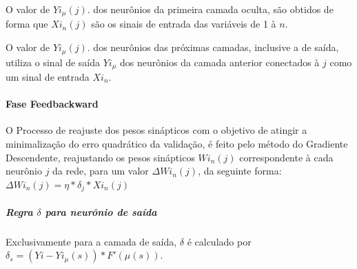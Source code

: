 \documentclass[	12pt, Times, openright, twoside, a4paper, english, brazil]{abntex2}
\begin{document}
           \begin{figure}[H]
           \end{figure}
            
            O valor de $Yi_{\mu}(j)$. dos neurônios da primeira camada oculta, são obtidos de forma que $Xi_{n}(j)$ são os sinais de entrada das variáveis de 1 à $n$.
            
            O valor de $Yi_{\mu}(j)$. dos neurônios das próximas camadas, inclusive a de saída, utiliza o sinal de saída $Yi_{\mu}$ dos neurônios da camada anterior conectados à $j$ como um sinal de entrada $Xi_{n}$.
            
            \paragraph*{Fase Feedbackward}
            O Processo de reajuste dos pesos sinápticos com o objetivo de atingir a minimalização do erro quadrático da validação, é feito pelo método do Gradiente Descendente, reajustando os pesos sinápticos $Wi_{n}(j)$ correspondente à cada neurônio $j$ da rede, para um valor $\Delta Wi_{n}(j)$, da seguinte forma:\\
            $\Delta Wi_{n}(j) = \eta*\delta_j*Xi_{n}(j)$\\
            
            \subparagraph*{Regra $\delta$ para neurônio de saída}
            Exclusivamente para a camada de saída, $\delta$ é calculado por\\
            $\delta_s = (Yi - Yi_{\mu}(s) )*F'(\mu(s))$.
            \begin{figure}[H]
           \end{figure}
            
\end{document}
